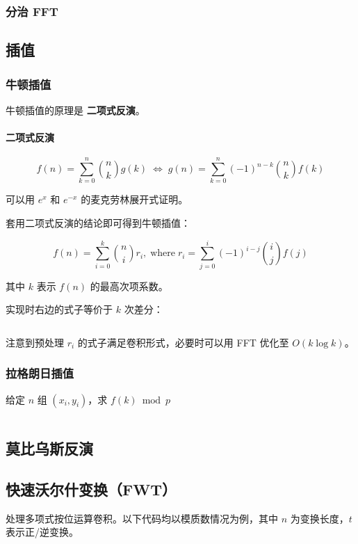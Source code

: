 \documentclass[a4paper, twoside]{article}
\begin{document}
    \subsubsection{分治 FFT}

\subsection{插值}
    \subsubsection{牛顿插值}
    \label{NewtonInterpolation}
    牛顿插值的原理是 \textbf{二项式反演}。

    \paragraph{二项式反演}
    
        $$ f(n) = \sum_{k = 0} ^ n \binom{n}{k} g(k) \; \iff \; g(n) = \sum_{k = 0} ^ n \left( -1 \right) ^ {n - k} \binom{n}{k} f(k) $$
    
    可以用 $e^x$ 和 $e^{-x}$ 的麦克劳林展开式证明。
    
    套用二项式反演的结论即可得到牛顿插值：
    
        $$ f(n) = \sum_{i = 0} ^ k \binom{n}{i} r_i , \; \text{where} \; r_i = \sum_{j = 0} ^ i (-1) ^ {i - j} \binom{i}{j} f(j) $$
    
    其中 $k$ 表示 $f(n)$ 的最高次项系数。
    
    实现时右边的式子等价于 $k$ 次差分：
    
    \inputminted{cpp}{../src/数学/牛顿插值.cpp}
    
    注意到预处理 $r_i$ 的式子满足卷积形式，必要时可以用 FFT 优化至 $O(k\log k)$。

    \subsubsection{拉格朗日插值}
    给定 $n$ 组 $(x_i, y_i)$，求 $f(k) \bmod p$
    \inputminted{cpp}{../src/数学/拉格朗日插值.cpp}

\subsection{莫比乌斯反演}

\subsection{快速沃尔什变换（FWT）}
处理多项式按位运算卷积。以下代码均以模质数情况为例，其中 $n$ 为变换长度，$t$ 表示正/逆变换。
\inputminted{cpp}{../src/数学/FWT.cpp}
\end{document}
